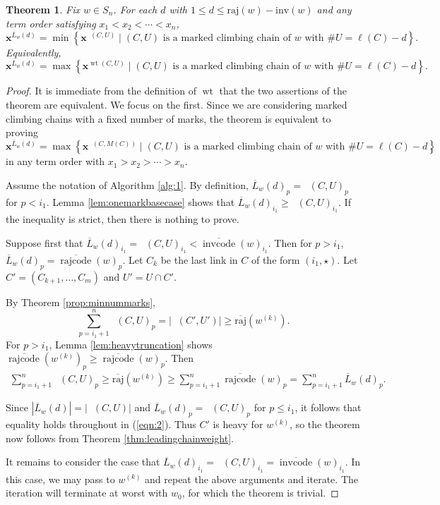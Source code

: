 \documentclass[11pt]{amsart}
\newtheorem{theorem}{Theorem}[section]
\theoremstyle{definition}
\theoremstyle{named}
\DeclareMathOperator{\cc}{\mathrm{invcode}} %
\newcommand{\occ}{\overline{\cc}} %
\DeclareMathOperator{\rr}{\mathrm{rajcode}} %
\newcommand{\orr}{\overline{\rr}} %
\newcommand{\LL}{\overline{L}}
\newcommand{\absrajcode}[1]{\mathrm{raj}(#1)}
\newcommand{\absoverrajcode}[1]{\overline{\mathrm{raj}}(#1)}
\newcommand{\absinvcode}[1]{\mathrm{inv}(#1)}
\DeclareMathOperator{\wt}{\mathrm{wt}}
\DeclareMathOperator{\dwt}{\overline{\mathrm{wt}}}
\begin{document}
	\begin{theorem}
		\label{thm:interpolatingleadingterms}
		Fix $w\in S_n$. For each $d$ with $1\leq d\leq \absrajcode{w}-\absinvcode{w}$ and any term order satisfying $x_1<x_2<\cdots<x_n$,
		\[\bm{x}^{\LL_w(d)} = \min \left\{\bm{x}^{\dwt(C,U)} \mid (C,U) \mbox{ is a marked climbing chain of } w \mbox{ with } \#U = 
		\ell(C) - d \right\}. \] 
		Equivalently, 
		\[\bm{x}^{L_w(d)} = \max \left\{\bm{x}^{\wt(C,U)} \mid (C,U) \mbox{ is a marked climbing chain of } w \mbox{ with } \#U = 
		\ell(C) - d \right\}. \] 
	\end{theorem}
	\begin{proof}
		It is immediate from the definition of $\wt$ that the two assertions of the theorem are equivalent. We focus on the first. Since we are considering marked climbing chains with a fixed number of marks, the theorem is equivalent to proving 
		\[\bm{x}^{\LL_w(d)} = \max \left\{\bm{x}^{\dwt(C,M(C))} \mid (C,U) \mbox{ is a marked climbing chain of } w \mbox{ with } \#U = 
		\ell(C) - d \right\}. \] 
		in any term order with $x_1>x_2>\cdots>x_n$. 
		
		Assume the notation of Algorithm \ref{alg:1}. 
		By definition, $\LL_w(d)_{p}=\dwt(C,U)_{p}$ for $p<i_1$. Lemma \ref{lem:onemarkbasecase} shows that $\LL_w(d)_{i_1}\geq\dwt(C,U)_{i_1}$. If the inequality is strict, then there is nothing to prove. 
		
		Suppose first that $\LL_w(d)_{i_1}=\dwt(C,U)_{i_1}<\occ(w)_{i_1}$. Then for $p>i_1$, $\LL_w(d)_p=\orr(w)_p$. 
		Let $C_k$ be the last link in $C$ of the form $(i_1,\star)$. Let $C'=(C_{k+1},\ldots,C_m)$ and $U'=U\cap C'$.
		
		By Theorem \ref{prop:minnummarks},
		\[\sum_{p=i_1+1}^n \dwt(C,U)_p = |\dwt(C',U')|\geq \absoverrajcode{w^{(k)}}. \]
		For $p>i_1$, Lemma \ref{lem:heavytruncation} shows $\orr(w^{(k)})_p\geq \orr(w)_p$. Then
		\begin{align}
			\label{eqn:2}
			\sum_{p=i_1+1}^n \dwt(C,U)_p \geq \absoverrajcode{w^{(k)}}\geq \sum_{p=i_1+1}^n\orr(w)_p = \sum_{p=i_1+1}^n\LL_w(d)_p.
		\end{align}
		
		Since $|\LL_w(d)| = |\dwt(C,U)|$ and $\LL_w(d)_p = \dwt(C,U)_p$ for $p\leq i_1$, it follows that equality holds throughout in (\ref{eqn:2}). Thus $C'$ is heavy for $w^{(k)}$, so the theorem now follows from Theorem \ref{thm:leadingchainweight}.
			
		It remains to consider the case that $\LL_w(d)_{i_1}=\dwt(C,U)_{i_1}=\occ(w)_{i_1}$. In this case, we may pass to $w^{(k)}$ and repeat the above arguments and iterate. The iteration will terminate at worst with $w_0$, for which the theorem is trivial.
	\end{proof}
\end{document}

